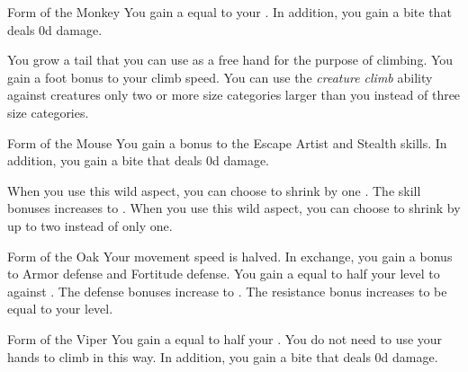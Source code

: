 {            %
            \begin{freeability}{Form of the Monkey}
                You gain a  equal to your .
                In addition, you gain a bite  that deals \plus0d damage.

                \rankline
                 You grow a tail that you can use as a free hand for the purpose of climbing.
                 You gain a  foot bonus to your climb speed.
                 You can use the \textit{creature climb} ability against creatures only two or more size categories larger than you instead of three size categories.
            \end{freeability}

            \begin{freeability}{Form of the Mouse}
                You gain a  bonus to the Escape Artist and Stealth skills.
                In addition, you gain a bite  that deals \plus0d damage.
                
                \rankline
                 When you use this wild aspect, you can choose to shrink by one .
                 The skill bonuses increases to .
                 When you use this wild aspect, you can choose to shrink by up to two  instead of only one.
            \end{freeability}

            \begin{freeability}{Form of the Oak}
                Your movement speed is halved.
                In exchange, you gain a  bonus to Armor defense and Fortitude defense.
                \rankline
                 You gain a  equal to half your level to  against .
                 The defense bonuses increase to .
                 The resistance bonus increases to be equal to your level.
            \end{freeability}

            \begin{freeability}{Form of the Viper}
                You gain a  equal to half your .
                You do not need to use your hands to climb in this way.
                In addition, you gain a bite  that deals \plus0d damage.


\end{freeability}}
